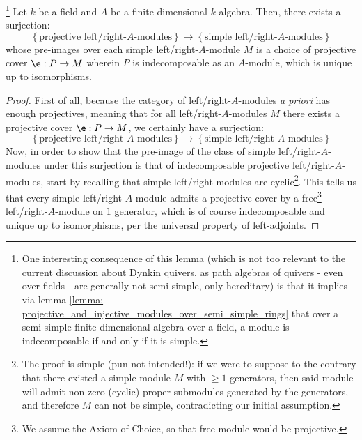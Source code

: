             \begin{lemma} \label{lemma: projective_indecomposable_modules_over_finite_algebras_are_simple}
                \footnote{One interesting consequence of this lemma (which is not too relevant to the current discussion about Dynkin quivers, as path algebras of quivers - even over fields - are generally not semi-simple, only hereditary) is that it implies via lemma \ref{lemma: projective_and_injective_modules_over_semi_simple_rings} that over a semi-simple finite-dimensional algebra over a field, a module is indecomposable if and only if it is simple.} Let $k$ be a field and $A$ be a finite-dimensional $k$-algebra. Then, there exists a surjection:
                    $$
                        \left\{\text{projective left/right-$A$-modules}\right\}
                        \to
                        \left\{\text{simple left/right-$A$-modules}\right\}
                    $$
                whose pre-images over each simple left/right-$A$-module $M$ is a choice of projective cover $\e: P \to M$ wherein $P$ is indecomposable as an $A$-module, which is unique up to isomorphisms. 
            \end{lemma}
                \begin{proof}
                    First of all, because the category of left/right-$A$-modules \textit{a priori} has enough projectives, meaning that for all left/right-$A$-modules $M$ there exists a projective cover $\e: P \to M$, we certainly have a surjection:
                        $$
                            \left\{\text{projective left/right-$A$-modules}\right\}
                            \to
                            \left\{\text{simple left/right-$A$-modules}\right\}
                        $$
                    Now, in order to show that the pre-image of the class of simple left/right-$A$-modules under this surjection is that of indecomposable projective left/right-$A$-modules, start by recalling that simple left/right-modules are cyclic\footnote{The proof is simple (pun not intended!): if we were to suppose to the contrary that there existed a simple module $M$ with $\geq 1$ generators, then said module will admit non-zero (cyclic) proper submodules generated by the generators, and therefore $M$ can not be simple, contradicting our initial assumption.}. This tells us that every simple left/right-$A$-module admits a projective cover by a free\footnote{We assume the Axiom of Choice, so that free module would be projective.} left/right-$A$-module on $1$ generator, which is of course indecomposable and unique up to isomorphisms, per the universal property of left-adjoints.
                \end{proof}

